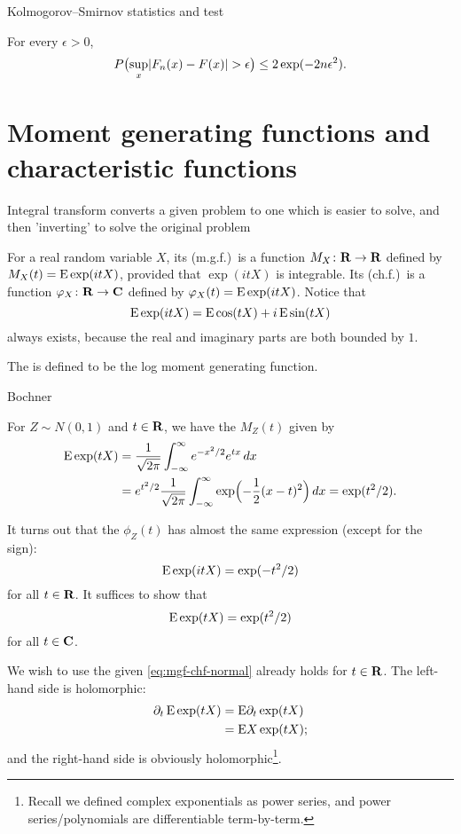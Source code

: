 Kolmogorov--Smirnov statistics and test

\begin{namedthm}
    For every $\epsilon > 0$, 
    \[P\bigl(\sup_{x} \lvert F_n(x) - F(x) \rvert > \epsilon\bigr) \leq 2\exp(-2n\epsilon^2).\]
\end{namedthm}

\section{Moment generating functions and characteristic functions}
Integral transform converts a given problem to one which is easier to solve, and then 'inverting' to solve the original problem

    For a real random variable $X$, its  (m.g.f.)\ is a function $M_X\colon \mathbf{R} \to \mathbf{R}$ defined by $M_X(t) = \mathop{}\!\mathrm{E} \exp(itX)$, provided that $\exp(itX)$ is integrable. Its  (ch.f.)\ is a function $\varphi_X\colon \mathbf{R} \to \mathbf{C}$ defined by $\varphi_X(t) = \mathop{}\!\mathrm{E}\exp(itX)$. Notice that \[
        \mathop{}\!\mathrm{E}\exp(itX) = \mathop{}\!\mathrm{E}\cos(tX) + i\mathop{}\!\mathrm{E}\sin(tX)
    \] always exists, because the real and imaginary parts are both bounded by $1$.

    The  is defined to be the log moment generating function.

    \cite[Theorem~7.13.1]{Bogachev_2007} Bochner

\begin{exa}
    For $Z \sim N(0,1)$ and $t\in \mathbf{R}$, we have the $M_Z(t)$ given by \begin{align*}
        \mathop{}\!\mathrm{E} \exp(tX) & = \frac{1}{\sqrt{2\pi}}\int_{-\infty}^\infty e^{-x^2/2} e^{tx} \,dx \\
        & = e^{t^2/2} \frac{1}{\sqrt{2\pi}} \int_{-\infty}^\infty \exp\Bigl(-\frac{1}{2}(x-t)^2\Bigr)\,dx = \exp(t^2/2).
    \end{align*}

    It turns out that the $\phi_Z(t)$ has almost the same expression (except for the sign): \[
        \mathop{}\!\mathrm{E} \exp(itX) = \exp(-t^2/2)
    \] for all $t\in \mathbf{R}$. It suffices to show that \begin{equation}
        \E \exp(tX) = \exp(t^2/2) \label{eq:mgf-chf-normal}
    \end{equation} for all $t\in \mathbf{C}$.
    
    We wish to use the  given \eqref{eq:mgf-chf-normal} already holds for $t\in \mathbf{R}$. The left-hand side is holomorphic: \begin{align*}
        \partial_t \mathop{}\!\mathrm{E}\exp(tX) & = \mathop{}\!\mathrm{E}\partial_t \exp(tX) \\
        & = \mathop{}\!\mathrm{E} X\exp(tX);
    \end{align*} and the right-hand side is obviously holomorphic\footnote{Recall we defined complex exponentials as power series, and power series/polynomials are differentiable term-by-term.}.
\end{exa}

